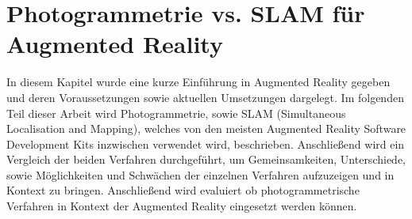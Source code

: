 \section{Photogrammetrie vs. SLAM für Augmented Reality}

In diesem Kapitel wurde eine kurze Einführung in Augmented Reality gegeben und deren Voraussetzungen sowie aktuellen Umsetzungen dargelegt. Im folgenden Teil dieser Arbeit wird Photogrammetrie, sowie SLAM (Simultaneous Localisation and Mapping), welches von den meisten Augmented Reality Software Development Kits inzwischen verwendet wird, beschrieben. Anschließend wird ein Vergleich der beiden Verfahren durchgeführt, um Gemeinsamkeiten, Unterschiede, sowie Möglichkeiten und Schwächen der einzelnen Verfahren aufzuzeigen und in Kontext zu bringen. Anschließend wird evaluiert ob photogrammetrische Verfahren in Kontext der Augmented Reality eingesetzt werden können.

